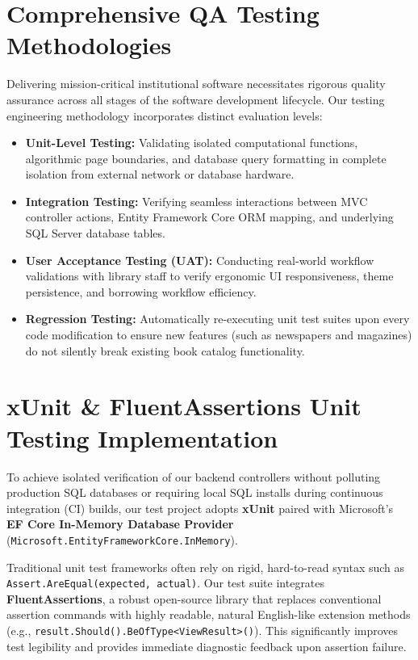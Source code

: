 \documentclass[11pt,a4paper]{report}
\begin{document}
\section{Comprehensive QA Testing Methodologies}
Delivering mission-critical institutional software necessitates rigorous quality assurance across all stages of the software development lifecycle. Our testing engineering methodology incorporates distinct evaluation levels:
\begin{itemize}[leftmargin=1.5em]
    \item \textbf{Unit-Level Testing:} Validating isolated computational functions, algorithmic page boundaries, and database query formatting in complete isolation from external network or database hardware.
    \item \textbf{Integration Testing:} Verifying seamless interactions between MVC controller actions, Entity Framework Core ORM mapping, and underlying SQL Server database tables.
    \item \textbf{User Acceptance Testing (UAT):} Conducting real-world workflow validations with library staff to verify ergonomic UI responsiveness, theme persistence, and borrowing workflow efficiency.
    \item \textbf{Regression Testing:} Automatically re-executing unit test suites upon every code modification to ensure new features (such as newspapers and magazines) do not silently break existing book catalog functionality.
\end{itemize}

\section{xUnit \& FluentAssertions Unit Testing Implementation}
To achieve isolated verification of our backend controllers without polluting production SQL databases or requiring local SQL installs during continuous integration (CI) builds, our test project adopts \textbf{xUnit} paired with Microsoft's \textbf{EF Core In-Memory Database Provider} (\texttt{Microsoft.EntityFrameworkCore.InMemory}).

Traditional unit test frameworks often rely on rigid, hard-to-read syntax such as \texttt{Assert.AreEqual(expected, actual)}. Our test suite integrates \textbf{FluentAssertions}, a robust open-source library that replaces conventional assertion commands with highly readable, natural English-like extension methods (e.g., \texttt{result.Should().BeOfType<ViewResult>()}). This significantly improves test legibility and provides immediate diagnostic feedback upon assertion failure.
\end{document}
